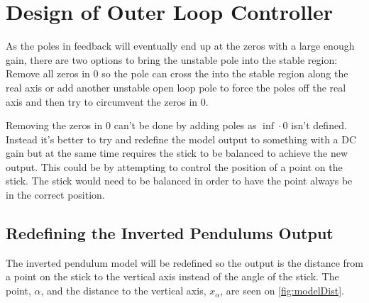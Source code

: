 


\section{Design of Outer Loop Controller}
As the poles in feedback will eventually end up at the zeros with a large enough gain, there are two options to bring the unstable pole into the stable region: Remove all zeros in 0 so the pole can cross the into the stable region along the real axis or add another unstable open loop pole to force the poles off the real axis and then try to circumvent the zeros in 0. 

Removing the zeros in 0 can't be done by adding poles as $\inf\cdot0$ isn't defined. Instead it's better to try and redefine the model output to something with a DC gain but at the same time requires the stick to be balanced to achieve the new output. This could be by attempting to control the position of a point on the stick. The stick would need to be balanced in order to have the point always be in the correct position.


\subsection{Redefining the Inverted Pendulums Output}
The inverted pendulum model will be redefined so the output is the distance from a point on the stick to the vertical axis instead of the angle of the stick. The point, $\alpha$, and the distance to the vertical axis, $x_\alpha$, are seen on \autoref{fig:modelDist}.

